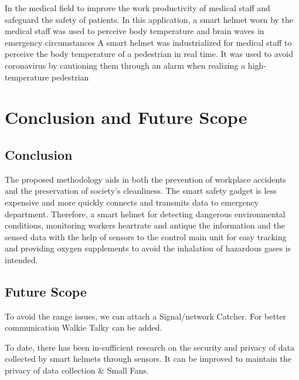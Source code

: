 \documentclass[12pt,a4paper]{report}
\begin{document}
\noindent 

\noindent 
\newline
\noindent
\newline
{}

\noindent In the medical field to improve the work productivity of medical staff and safeguard the safety of patients. In this application, a smart helmet worn by the medical staff was used to perceive body temperature and brain waves in emergency circumstances  A smart helmet was industrialized for medical staff to perceive the body temperature of a pedestrian in real time. It was used to avoid coronavirus by cautioning them through an alarm when realizing a high-temperature pedestrian

\noindent  
\newpage



\chapter{Conclusion and Future Scope}

\noindent \textbf{}

\noindent 

\noindent
\section{Conclusion}

\noindent The proposed methodology aids in both the prevention of workplace accidents and the preservation of society's cleanliness. The smart safety gadget is less expensive and more quickly connects  and transmits data to emergency department. Therefore, a smart helmet for detecting dangerous environmental conditions, monitoring workers heartrate and antique the information and the sensed data with the help of sensors to the control main unit for easy tracking and providing oxygen supplements to avoid the inhalation of hazardous gases is intended.

\noindent 
\section{Future Scope}

\noindent To avoid the range issues, we can attach a Signal/network Catcher. For better communication Walkie Talky can be added.\textbf{}

\noindent To date, there has been in-sufficient research on the security and privacy of data collected by smart helmets through sensors. It can be improved to maintain the privacy of data collection \& Small Fans.
\newpage
\end{document}

